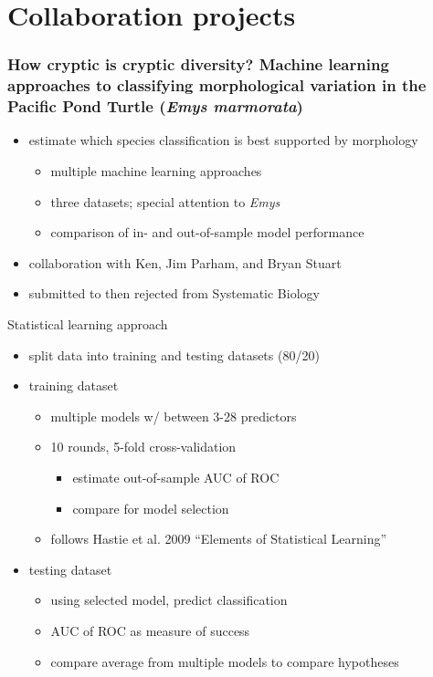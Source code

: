 \documentclass{beamer}
\begin{document}
\section{Collaboration projects}

\begin{frame}
  \frametitle{How cryptic is cryptic diversity? Machine learning approaches to classifying morphological variation in the Pacific Pond Turtle (\textit{Emys marmorata})}
  \begin{itemize}
    \item estimate which species classification is best supported by morphology
      \begin{itemize}
        \item multiple machine learning approaches
        \item three datasets; special attention to \textit{Emys}
        \item comparison of in- and out-of-sample model performance
      \end{itemize}
    \item collaboration with Ken, Jim Parham, and Bryan Stuart
    \item submitted to then rejected from Systematic Biology
  \end{itemize}
\end{frame}

\begin{frame}
  \begin{block}{Statistical learning approach}
    \begin{itemize}
      \item split data into training and testing datasets (80/20)
      \item training dataset
        \begin{itemize}
          \item multiple models w/ between 3-28 predictors
          \item 10 rounds, 5-fold cross-validation
            \begin{itemize}
              \item estimate out-of-sample AUC of ROC
              \item compare for model selection 
            \end{itemize}
          \item follows Hastie et al. 2009 ``Elements of Statistical Learning''
        \end{itemize}
      \item testing dataset
        \begin{itemize}
          \item using selected model, predict classification
          \item AUC of ROC as measure of success
          \item compare average from multiple models to compare hypotheses
        \end{itemize}
    \end{itemize}
  \end{block}
\end{frame}
\end{document}
